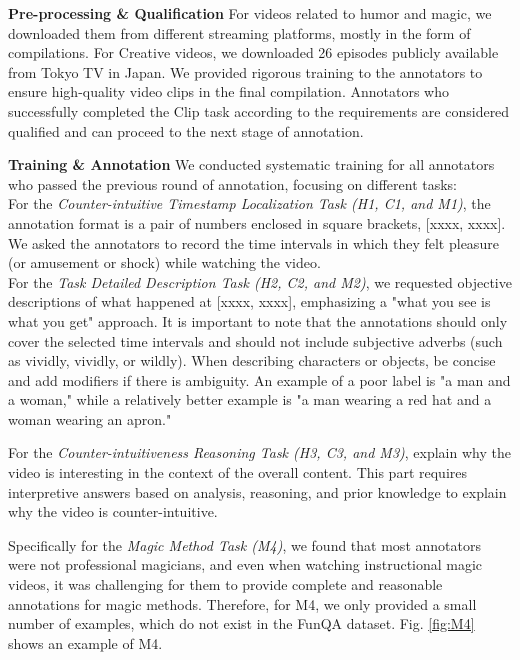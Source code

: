 \noindent\textbf{Pre-processing \& Qualification}\quad
For videos related to humor and magic, we downloaded them from different streaming platforms, mostly in the form of compilations. For Creative videos, we downloaded 26 episodes publicly available from Tokyo TV in Japan. We provided rigorous training to the annotators to ensure high-quality video clips in the final compilation. Annotators who successfully completed the Clip task according to the requirements are considered qualified and can proceed to the next stage of annotation.

\noindent\textbf{Training \& Annotation}\quad
We conducted systematic training for all annotators who passed the previous round of annotation, focusing on different tasks: \\
For the \textit{Counter-intuitive Timestamp Localization Task (H1, C1, and M1)}, the annotation format is a pair of numbers enclosed in square brackets, [xxxx, xxxx]. We asked the annotators to record the time intervals in which they felt pleasure (or amusement or shock) while watching the video. \\
For the \textit{Task Detailed Description Task (H2, C2, and M2)}, we requested objective descriptions of what happened at [xxxx, xxxx], emphasizing a "what you see is what you get" approach. It is important to note that the annotations should only cover the selected time intervals and should not include subjective adverbs (such as vividly, vividly, or wildly). When describing characters or objects, be concise and add modifiers if there is ambiguity. An example of a poor label is "a man and a woman," while a relatively better example is "a man wearing a red hat and a woman wearing an apron." 

For the \textit{Counter-intuitiveness Reasoning Task (H3, C3, and M3)}, explain why the video is interesting in the context of the overall content. This part requires interpretive answers based on analysis, reasoning, and prior knowledge to explain why the video is counter-intuitive.

Specifically for the \textit{Magic Method Task (M4)}, we found that most annotators were not professional magicians, and even when watching instructional magic videos, it was challenging for them to provide complete and reasonable annotations for magic methods. Therefore, for M4, we only provided a small number of examples, which do not exist in the FunQA dataset. Fig. \ref{fig:M4} shows an example of M4.

